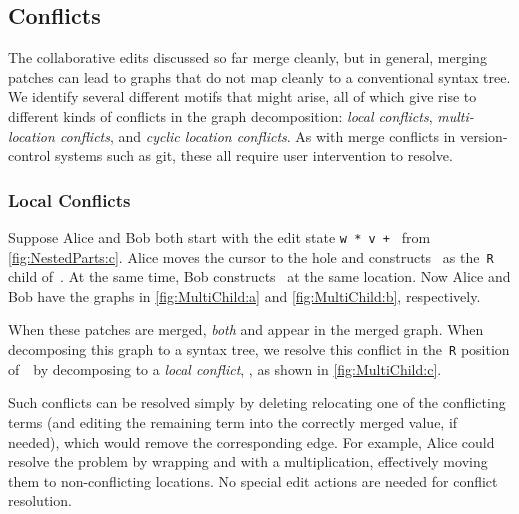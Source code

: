 \subsection{Conflicts}%
\label{sub:Merge Conflicts}

The collaborative edits discussed so far merge cleanly,
but in general, merging patches can lead to graphs that do not map cleanly to a conventional syntax tree. We identify several different motifs that might arise, all of which give rise to different kinds of conflicts in the graph decomposition: \emph{local conflicts}, \emph{multi-location conflicts}, and \emph{cyclic location conflicts}. 
As with merge conflicts in version-control systems such as git, these all require user intervention to resolve.

\subsubsection{Local Conflicts}%
\label{sub:Multi-child conflicts}

\figureMultiChild

Suppose Alice and Bob both start with the edit state \texttt{w * v + \hole} from \autoref{fig:NestedParts:c}.
Alice moves the cursor to the hole and constructs~\vMultiChildAlice{} as the~\texttt{R} child of~\vWrapPlus{}.
At the same time, Bob constructs~\vMultiChildBob{} at the same location.
Now Alice and Bob have the graphs in \autoref{fig:MultiChild:a} and \autoref{fig:MultiChild:b}, respectively.

When these patches are merged, \emph{both} \eMultiChildAlice{} and \eMultiChildBob{}
appear in the merged graph. 
When decomposing this graph to a syntax tree, 
we resolve this conflict in the~\texttt{R} position of~\vWrapPlus~by decomposing to a \emph{local conflict}, , as 
shown in \autoref{fig:MultiChild:c}.


Such conflicts can be resolved simply by deleting relocating one of the conflicting terms (and editing the remaining term into the correctly merged value, if needed), which would remove the corresponding edge.
For example, Alice could resolve the problem by wrapping  and  with a multiplication, effectively moving them to non-conflicting locations.
No special edit actions are needed for conflict resolution.


